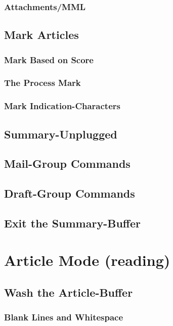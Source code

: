 \documentclass{article}
\begin{document}
        \subsubsection*{Attachments/MML}
        \MsgCompositionMML
    \subsection*{Mark Articles}
    \MarkArticlesGeneral
        \subsubsection*{Mark Based on Score}
        \MarkByScore
        \subsubsection*{The Process Mark}
        \ProcessMark
        \subsubsection*{Mark Indication-Characters}
        \MarkCharacters
%
    \subsection*{Summary-Unplugged}
    \SummaryUnplugged
    \subsection*{Mail-Group Commands}
    \MailGroups
    \subsection*{Draft-Group Commands}
    \DraftGroup
    \subsection*{Exit the Summary-Buffer}
    \ExitSummary
%
%
\section*{Article Mode (reading)}
\ArticleModeGeneral
    \subsection*{Wash the Article-Buffer}
    \WashArticle
    \subsubsection*{Blank Lines and Whitespace}
    \BlankAndWhitespace
\end{document}
